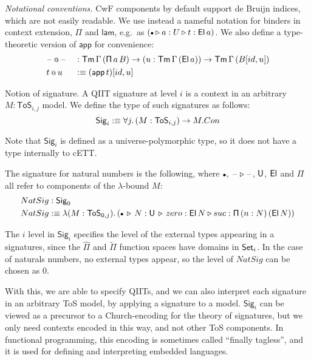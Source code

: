 \documentclass{llncs}
\makeatletter
\newcommand{\ToS}{\mathsf{ToS}}
\newcommand{\ext}{\triangleright}
\newcommand{\emptycon}{\scaleobj{.75}\bullet}
\newcommand{\Pii}{\mathsf{\Pi}}
\newcommand{\appi}{\mathsf{app}}
\newcommand{\lami}{\mathsf{lam}}
\newcommand{\Pie}{\mathsf{\hat{\Pi}}}
\newcommand{\Piinf}{\mathsf{\tilde{\Pi}}}
\newcommand{\appitt}{\mathop{{\scriptstyle @}}}
\newcommand{\Sig}{\mathsf{Sig}}
\makeatother
\begin{document}
\emph{Notational conventions.} CwF components by default support de Bruijn
indices, which are not easily readable. We use instead a nameful notation for
binders in context extension, $\Pii$ and $\lami$, e.g.\ as $(\emptycon \ext a :
U \ext t : \El\,a)$. We also define a type-theoretic version of $\appi$ for
convenience:
\begin{alignat*}{3}
  & \blank\appitt\blank && :
      \Tm\,\Gamma\,(\Pii\,a\,B)\ra
      (u : \Tm\,\Gamma\,(\El\,a)) \ra \Tm\,\Gamma\,(B[id, u])\\
  & t\appitt u && :\equiv (\appi\,t)[id, u]
\end{alignat*}

\begin{nidefinition}{Notion of signature.}
A QIIT signature at level $i$ is a context in an arbitrary $M : \ToS_{i,j}$
model. We define the type of such signatures as follows:
\[
  \Sig_i :\equiv \forall j.\,(M : \ToS_{i,j})\ra M.Con
\]

Note that $\Sig_i$ is defined as a universe-polymorphic type, so it does not
have a type internally to cETT.

\begin{example}
The signature for natural
numbers is the following, where $\emptycon$, $\blank\ext\blank$, $\mathsf{U}$, $\mathsf{El}$ and
$\Pii$ all refer to components of the $\lambda$-bound $M$:
\begin{alignat*}{3}
  & NatSig : \Sig_0 \\
  & NatSig :\equiv \lambda (M : \ToS_{0,j}).\,(\emptycon\,\ext\, N : \U \,\ext\, zero : \El\,N \ext suc : \Pii\,(n : N)\,(\El\,N))
\end{alignat*}
\end{example}

The $i$ level in $\Sig_i$ specifies the level of the external types appearing in
a signatures, since the $\Pie$ and $\Piinf$ function spaces have domains in $\mathsf{Set}_i$.
In the case of naturals numbers, no external types appear, so the level of $NatSig$
can be chosen as $0$.

With this, we are able to specify QIITs, and we can also interpret each
signature in an arbitrary ToS model, by applying a signature to a model.
$\Sig_i$ can be viewed as a precursor to a Church-encoding for the theory of
signatures, but we only need contexts encoded in this way, and not other ToS
components. In functional programming, this encoding is sometimes called
``finally tagless''\cite{TODO}, and it is used for defining and interpreting
embedded languages.
\end{nidefinition}
\end{document}

